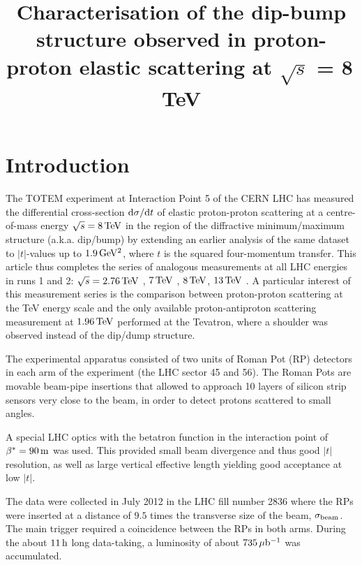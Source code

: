 \documentclass[doublecol]{epl/epl2}
\title{Characterisation of the dip-bump structure observed in proton-proton elastic scattering at $\sqrt s$ = 8\,TeV}
\def\d{{\rm d}}
\def\un#1{\,{\rm #1}}
\begin{document}
\maketitle

\section{Introduction}
\label{s:introduction}

The TOTEM experiment at Interaction Point 5 of the CERN LHC has measured the differential cross-section $\d\sigma/\d t$ of elastic proton-proton scattering at a centre-of-mass energy $\sqrt{s} = 8\un{TeV}$ in the region of the diffractive minimum/maximum structure (a.k.a. dip/bump) by extending an earlier analysis \cite{totem-8tev-90m} of the same dataset to $|t|$-values up to $1.9\un{GeV^{2}}$, where $t$ is the squared four-momentum transfer. This article thus completes the series of analogous measurements at all LHC energies in runs 1 and 2: $\sqrt{s} = 2.76\un{TeV}$ \cite{totem-2.76tev-diff}, $7\un{TeV}$ \cite{totem-7tev-3.5m}, $8\un{TeV}$, $13\un{TeV}$ \cite{totem-13tev-diff}. A particular interest of this measurement series is the comparison between proton-proton scattering at the TeV energy scale and the only available proton-antiproton scattering measurement at $1.96\un{TeV}$ performed at the Tevatron, where a shoulder was observed instead of the dip/dump structure.


The experimental apparatus consisted of two units of Roman Pot (RP) detectors in each arm of the experiment (the LHC sector 45 and 56). The Roman Pots are movable beam-pipe insertions that allowed to approach 10 layers of silicon strip sensors very close to the beam, in order to detect protons scattered to small angles.

A special LHC optics with the betatron function in the interaction point of $\beta^* = 90\un{m}$ was used. This provided small beam divergence and thus good $|t|$ resolution, as well as large vertical effective length yielding good acceptance at low $|t|$.

The data were collected in July 2012 in the LHC fill number 2836 where the RPs were inserted at a distance of $9.5$ times the transverse size of the beam, $\sigma_{\rm beam}$. The main trigger required a coincidence between the RPs in both arms. During the about $11\un{h}$ long data-taking, a luminosity of about $735\un{\mu b^{-1}}$ was accumulated.
\end{document}

